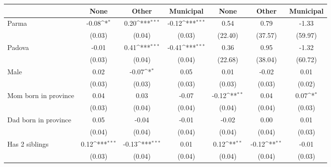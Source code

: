 {
\def\sym#1{\ifmmode^{#1}\else\(^{#1}\)\fi}
\begin{tabular}{l*{6}{c}}
\toprule
                    &\multicolumn{1}{c}{None}&\multicolumn{1}{c}{Other}&\multicolumn{1}{c}{Municipal}&\multicolumn{1}{c}{None}&\multicolumn{1}{c}{Other}&\multicolumn{1}{c}{Municipal}\\
\midrule
Parma          &       -0.08\sym{*}  &        0.20\sym{***}&       -0.12\sym{***}&        0.54         &        0.79         &       -1.33         \\
                    &      (0.03)         &      (0.04)         &      (0.03)         &     (22.40)         &     (37.57)         &     (59.97)         \\
\addlinespace
Padova         &       -0.01         &        0.41\sym{***}&       -0.41\sym{***}&        0.36         &        0.95         &       -1.32         \\
                    &      (0.03)         &      (0.04)         &      (0.04)         &     (22.68)         &     (38.04)         &     (60.72)         \\
\addlinespace
Male                &        0.02         &       -0.07\sym{*}  &        0.05         &        0.01         &       -0.02         &        0.01         \\
                    &      (0.03)         &      (0.03)         &      (0.03)         &      (0.03)         &      (0.03)         &      (0.02)         \\
\addlinespace
Mom born in province&        0.04         &        0.03         &       -0.07         &       -0.12\sym{**} &        0.04         &        0.07\sym{*}  \\
                    &      (0.03)         &      (0.04)         &      (0.04)         &      (0.04)         &      (0.04)         &      (0.03)         \\
\addlinespace
Dad born in province&        0.05         &       -0.04         &       -0.01         &       -0.02         &        0.00         &        0.01         \\
                    &      (0.04)         &      (0.04)         &      (0.04)         &      (0.04)         &      (0.04)         &      (0.03)         \\
\addlinespace
Has 2 siblings      &        0.12\sym{***}&       -0.13\sym{***}&        0.01         &        0.12\sym{**} &       -0.12\sym{**} &       -0.01         \\
                    &      (0.03)         &      (0.04)         &      (0.04)         &      (0.04)         &      (0.04)         &      (0.03)         \\

\end{tabular}}
